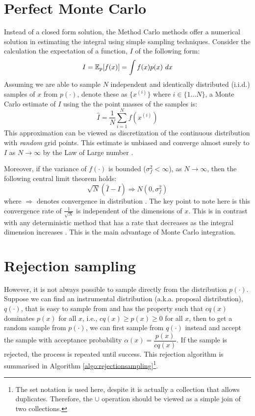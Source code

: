 \section{Perfect Monte Carlo}
Instead of a closed form solution, the Method Carlo methods offer a numerical solution in estimating the integral using simple sampling techniques. Consider the calculation the expectation of a function, $I$ of the following form:
\begin{equation}
  I = \operatorname{\mathbb{E}}_p[f(x)] = \int f(x)p(x)~dx
\label{eq:expectation}
\end{equation}
Assuming we are able to sample $N$ independent and identically distributed (i.i.d.) samples of $x$ from $p(\cdot)$, denote these as $\{x^{(i)}\}$ where $i \in \{1 \ldots N\}$, a Monte Carlo estimate of $I$ using the the point masses of the samples is:
\begin{equation}
  \hat{I} = \frac{1}{N} \sum^N_{i=1} f(x^{(i)})
\end{equation}
This approximation can be viewed as discretization of the continuous distribution with \emph{random} grid points. This estimate is unbiased and converge almost surely to $I$ as $N \to \infty$ by the Law of Large number \cite{RCP05}. 

Moreover, if the variance of $f(\cdot)$ is bounded ($\sigma^2_f < \infty$), as $N \to \infty$, then the following central limit theorem holds:
\begin{equation}
  \sqrt{N}(\hat{I} - I) \Longrightarrow N(0, \sigma^2_f)
\end{equation}
where $\Longrightarrow$ denotes convergence in distribution \cite{AD09}. The key point to note here is this convergence rate of $\frac{1}{\sqrt{N}}$ is independent of the dimensions of $x$. This is in contrast with any deterministic method that has a rate that decreases as the integral dimension increases \cite{RCP05}. This is the main advantage of Monte Carlo integration.

\section{Rejection sampling}
However, it is not always possible to sample directly from the distribution $p(\cdot)$. Suppose we can find an instrumental distribution (a.k.a. proposal distribution), $q(\cdot)$, that is easy to sample from and has the property such that $cq(x)$ dominates $p(x)$ for all $x$, i.e., $cq(x) \geq p(x) \geq 0$ for all $x$, then to get a random sample from $p(\cdot)$, we can first sample from $q(\cdot)$ instead and accept the sample with acceptance probability $\alpha(x)=\dfrac{p(x)}{cq(x)}$. If the sample is rejected, the process is repeated until success. This rejection algorithm is summarised in Algorithm \ref{algo:rejectionsampling}\footnote{The set notation is used here, despite it is actually a collection that allows duplicates. Therefore, the $\cup$ operation should be viewed as a simple join of two collections.}.

